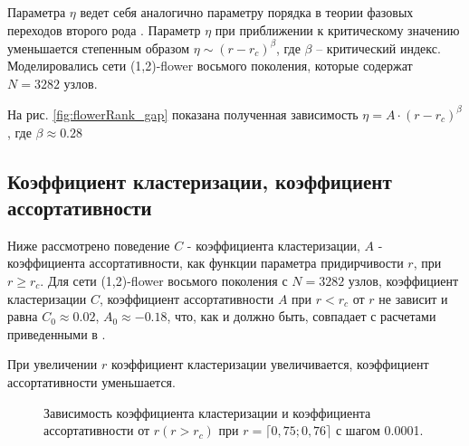 \documentclass[10pt,aps,pra]{revtex4-1}
\begin{document}
        Параметра $\eta$ ведет себя аналогично параметру порядка в теории фазовых переходов второго рода \cite{Landau}. Параметр $\eta$ при приближении к критическому значению уменьшается степенным образом $\eta \sim (r-r_c)^\beta$, где $\beta$ – критический индекс. 
        Моделировались сети (1,2)-flower восьмого поколения, которые содержат $N=3282$ узлов.

        На рис. \ref{fig:flowerRank_gap} показана полученная зависимость $\eta = A \cdot {(r-r_c)}^\beta$, где $\beta \approx 0.28$

    \subsection{Коэффициент кластеризации, коэффициент ассортативности}

        Ниже рассмотрено поведение $C$ - коэффициента кластеризации, $A$ - коэффициента ассортативности, как функции параметра придирчивости $r$, при $r \geq r_c$. Для сети (1,2)-flower восьмого поколения с $N=3282$ узлов, коэффициент кластеризации $C$, коэффициент ассортативности $A$ при $r<r_c$ от $r$ не зависит и равна $C_0 \approx 0.02$, $A_0 \approx -0.18$, что, как и должно быть, совпадает с расчетами приведенными в \cite{Rozenfeld1,Rozenfeld2}. 

        При увеличении $r$ коэффициент кластеризации увеличивается, коэффициент ассортативности уменьшается.

            \begin{figure}[H]  
                \centering

                \caption{
                    \label{fig:flowerParam}
                    Зависимость коэффициента кластеризации и коэффициента ассортативности от $r (r>r_c)$ при $r=\lceil 0,75; 0,76 \rceil$ с шагом 0.0001.
                }
            \end{figure}
\end{document}
